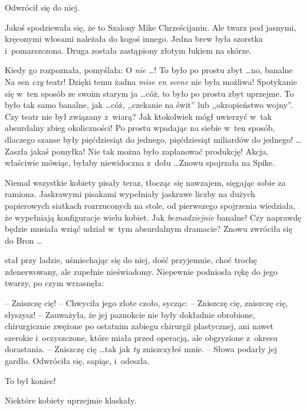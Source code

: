 \documentclass[oneside,polish,11pt,rmheadings]{mwbk}
\begin{document}
Odwrócił się do niej. 

Jakoś spodziewała się, że to Szalony Mike Chrześcijanin. Ale twarz pod jasnymi, kręconymi włosami należała do kogoś innego. Jedna brew była szorstka i~pomarszczona. Druga została zastąpiony złotym łukiem na skórze. 

Kiedy go rozpoznała, pomyślała: O \textit{nie } \ldots ! To było po prostu zbyt \ldots  no, banalne Na sen \textit{czy }teatr! Dzięki temu żadna \textit{mise en scene }nie była możliwa! Spotykanie się w~ten sposób ze swoim starym ja \ldots  cóż, to było po prostu zbyt uprzejme. To było tak samo banalne, jak \ldots  cóż, ,,czekanie na świt'' lub ,,okropieństwo wojny''. Czy teatr nie był związany z~wiarą? Jak ktokolwiek mógł uwierzyć w~tak absurdalny zbieg okoliczności! Po prostu wpadając na siebie w~ten sposób, dlaczego szanse były pięćdziesiąt do jednego, pięćdziesiąt miliardów do jednego!  \ldots  Zaszła jakaś pomyłka! Nie tak można było zaplanować produkcję! Akcja, właściwie mówiąc, byłaby niewidoczna z~dołu \ldots  Znowu spojrzała na Spike. 

Niemal wszystkie kobiety pisały teraz, tłocząc się nawzajem, sięgając sobie za ramiona. Jaskrawymi pisakami wypełniały jaskrawe liczby na dużych papierowych siatkach rozrzuconych na stole, od pierwszego spojrzenia wiedziała, że wypełniają konfiguracje wielu kobiet. Jak \textit{beznadziejnie }banalne! Czy naprawdę będzie musiała wziąć udział w~tym absurdalnym dramacie? Znowu zwróciła się do Bron \ldots  

stał przy ladzie, uśmiechając się do niej, dość przyjemnie, choć trochę zdenerwowany, ale zupełnie nieświadomy. Niepewnie podniosła rękę do jego twarzy, po czym wrzasnęła: 

-- Zniszczę cię! --  Chwyciła jego złote czoło, sycząc: -- Zniszczę cię, zniszczę cię, słyszysz! -- Zauważyła, że jej paznokcie nie były dokładnie obrobione, chirurgicznie zwężone po ostatnim zabiegu chirurgii plastycznej, ani nawet szerokie i~oczyszczone, które miała przed operacją, ale obgryzione z~okresu dorastania. --  Zniszczę cię \ldots  tak jak \textit{ty }zniszczyłeś mnie. --  Słowa podarły jej gardło. Odwróciła się, sapiąc, i~odeszła. 

To był koniec! 

Niektóre kobiety uprzejmie klaskały. 
\end{document}

